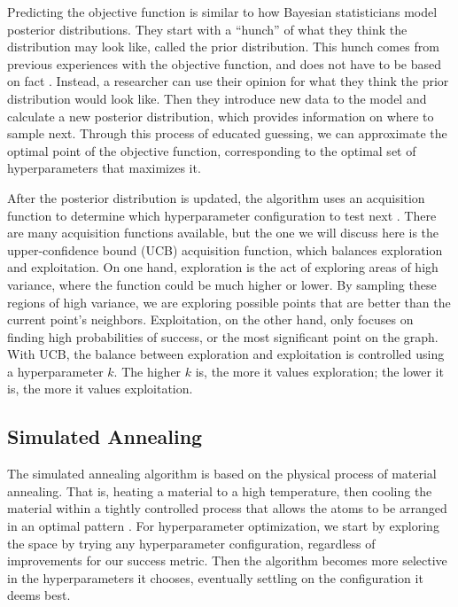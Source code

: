 \documentclass[stu,12pt,floatsintext]{apa7}
\begin{document}
Predicting the objective function is similar to how Bayesian statisticians model posterior distributions. They start with a ``hunch'' of what they think the distribution may look like, called the prior distribution. This hunch comes from previous experiences with the objective function, and does not have to be based on fact \parencite{WU201926}. Instead, a researcher can use their opinion for what they think the prior distribution would look like.  Then they introduce new data to the model and calculate a new posterior distribution, which provides information on where to sample next. Through this process of educated guessing, we can approximate the optimal point of the objective function, corresponding to the optimal set of hyperparameters that maximizes it.

After the posterior distribution is updated, the algorithm uses an acquisition function to determine which hyperparameter configuration to test next \parencite{WU201926}. There are many acquisition functions available, but the one we will discuss here is the upper-confidence bound (UCB) acquisition function, which balances exploration and exploitation. On one hand, exploration is the act of exploring areas of high variance, where the function could be much higher or lower. By sampling these regions of high variance, we are exploring possible points that are better than the current point's neighbors. Exploitation, on the other hand, only focuses on finding high probabilities of success, or the most significant point on the graph. With UCB, the balance between exploration and exploitation is controlled using a hyperparameter \(k\). The higher \(k\) is, the more it values exploration; the lower it is, the more it values exploitation.

\subsection{Simulated Annealing}

The simulated annealing algorithm is based on the physical process of material annealing. That is, heating a material to a high temperature, then cooling the material within a tightly controlled process that allows the atoms to be arranged in an optimal pattern \parencite{rutenbar2002simulated}. For hyperparameter optimization, we start by exploring the space by trying any hyperparameter configuration, regardless of improvements for our success metric. Then the algorithm becomes more selective in the hyperparameters it chooses, eventually settling on the configuration it deems best. 
\end{document}
